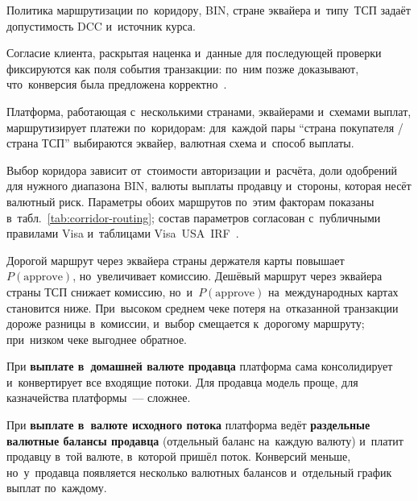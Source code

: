 Политика маршрутизации по~коридору, BIN, стране эквайера и~типу~ТСП задаёт
допустимость DCC и~источник курса.

Согласие клиента, раскрытая наценка и~данные для последующей проверки
фиксируются как поля события транзакции: по~ним позже доказывают,
что~конверсия была предложена корректно~\cite{visa-core-rules,mc-tpr}.

Платформа, работающая с~несколькими странами, эквайерами и~схемами выплат,
маршрутизирует платежи по~коридорам: для~каждой пары \enquote{страна покупателя
/ страна ТСП} выбираются эквайер, валютная схема и~способ выплаты.

Выбор коридора зависит от~стоимости авторизации и~расчёта, доли одобрений для
нужного диапазона BIN, валюты выплаты продавцу и~стороны, которая несёт
валютный риск. Параметры обоих маршрутов по~этим факторам показаны
в~табл.~\ref{tab:corridor-routing}; состав параметров согласован с~публичными
правилами Visa и~таблицами Visa~USA~IRF~\cite{visa-core-rules,visa-interchange}.

Дорогой маршрут через эквайера страны держателя карты повышает
\(P(\text{approve})\), но~увеличивает комиссию. Дешёвый маршрут через
эквайера страны ТСП снижает комиссию, но~и~\(P(\text{approve})\)
на~международных картах становится ниже. При~высоком среднем чеке потеря
на~отказанной транзакции дороже разницы в~комиссии, и~выбор смещается
к~дорогому маршруту; при~низком чеке выгоднее обратное.

При \textbf{выплате в~домашней валюте продавца} платформа сама консолидирует
и~конвертирует все входящие потоки. Для продавца модель проще, для
казначейства платформы~--- сложнее.

При \textbf{выплате в~валюте исходного потока} платформа ведёт
\textbf{раздельные валютные балансы продавца} (отдельный баланс на~каждую
валюту) и~платит продавцу в~той валюте, в~которой пришёл поток. Конверсий
меньше, но~у~продавца появляется несколько валютных балансов и~отдельный
график выплат по~каждому.

